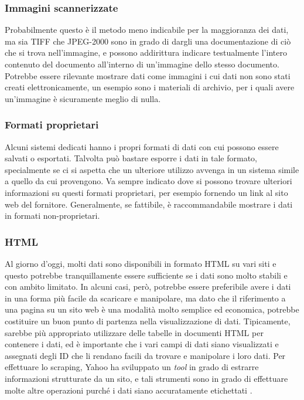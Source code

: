\subsubsection{Immagini scannerizzate}
Probabilmente questo è il metodo meno indicabile per la maggioranza dei dati, ma sia TIFF che JPEG-2000 sono in grado di dargli una documentazione di ciò che si trova nell'immagine, e possono addirittura indicare testualmente l'intero contenuto del documento all'interno di un'immagine dello stesso documento. Potrebbe essere rilevante mostrare dati come immagini i cui dati non sono stati creati elettronicamente, un esempio sono i materiali di archivio, per i quali avere un'immagine è sicuramente meglio di nulla.
\subsubsection{Formati proprietari}
Alcuni sistemi dedicati hanno i propri formati di dati con cui possono essere salvati o esportati. Talvolta può bastare esporre i dati in tale formato, specialmente se ci si aspetta che un ulteriore utilizzo avvenga in un sistema simile a quello da cui provengono. Va sempre indicato dove si possono trovare ulteriori informazioni su questi formati proprietari, per esempio fornendo un link al sito web del fornitore. Generalmente, se fattibile, è raccommandabile mostrare i dati in formati non-proprietari.
\subsubsection{HTML}
Al giorno d'oggi, molti dati sono disponibili in formato HTML su vari siti e questo potrebbe tranquillamente essere sufficiente se i dati sono molto stabili e con ambito limitato. In alcuni casi, però, potrebbe essere preferibile avere i dati in una forma più facile da scaricare e manipolare, ma dato che il riferimento a una pagina su un sito web è una modalità molto semplice ed economica, potrebbe costituire un buon punto di partenza nella visualizzazione di dati. Tipicamente, sarebbe più appropriato utilizzare delle tabelle in documenti HTML per contenere i dati, ed è importante che i vari campi di dati siano visualizzati e assegnati degli ID che li rendano facili da trovare e manipolare i loro dati. Per effettuare lo scraping, Yahoo ha sviluppato un \textit{tool} in grado di estrarre informazioni strutturate da un sito, e tali strumenti sono in grado di effettuare molte altre operazioni purché i dati siano accuratamente etichettati \cite{YahooDevelopers_YQL}.

